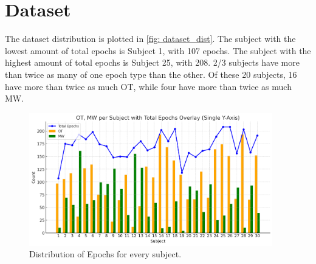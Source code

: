 \section{Dataset}
The dataset distribution is plotted in \autoref{fig: dataset_dist}. The subject with the lowest amount of total epochs is Subject 1, with 107 epochs. The subject with the highest amount of total epochs is Subject 25, with 208. 2/3 subjects have more than twice as many of one epoch type than the other. Of these 20 subjects, 16 have more than twice as much OT, while four have more than twice as much MW.
\begin{figure}[H]
    \centering
    \includegraphics[width=400px]{Figures/dataset_dist.png}
    \caption{Distribution of Epochs for every subject.}
    \label{fig: dataset_dist}
\end{figure}
%
%
%
%